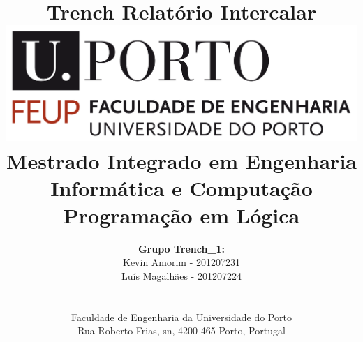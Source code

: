 \documentclass[a4paper]{article}
\begin{document}
\setlength{\textwidth}{16cm}
\setlength{\textheight}{22cm}

\title{\Huge\textbf{Trench}\linebreak\linebreak\linebreak
\Large\textbf{Relatório Intercalar}\linebreak\linebreak
\linebreak\linebreak
\includegraphics[scale=0.1]{feup-logo.png}\linebreak\linebreak
\linebreak\linebreak
\Large{Mestrado Integrado em Engenharia Informática e Computação} \linebreak\linebreak
\Large{Programação em Lógica}\linebreak
}

\author{\textbf{Grupo Trench_1:}\\
Kevin Amorim - 201207231 \\
Luís Magalhães - 201207224 \\
\linebreak\linebreak \\
 \\ Faculdade de Engenharia da Universidade do Porto \\ Rua Roberto Frias, s\/n, 4200-465 Porto, Portugal \linebreak\linebreak\linebreak
\linebreak\linebreak\vspace{1cm}}

\maketitle
\thispagestyle{empty}
\end{document}
